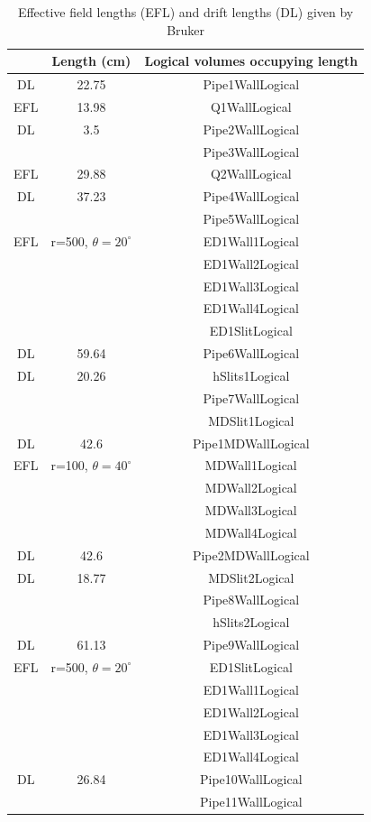 \documentclass[letter,11pt]{article}
\begin{document}
\begin{table}
\caption{Effective field lengths (EFL) and drift lengths (DL) given by Bruker}\label{tab:lengths}
\centering
\begin{threeparttable}
\begin{tabular}{ccc}
\hline
	&Length (cm)	&Logical volumes occupying length\\
\hline
DL	&22.75	&Pipe1WallLogical\\
EFL	&13.98	&Q1WallLogical\\
DL	&3.5		&Pipe2WallLogical\\
	&		&Pipe3WallLogical\\
EFL	&29.88	&Q2WallLogical\\
DL	&37.23	&Pipe4WallLogical\\
	&		&Pipe5WallLogical\\
EFL	&r=500, $\theta=20^{\circ}$\tnote{a}	&ED1Wall1Logical\\
	&		&ED1Wall2Logical\\
	&		&ED1Wall3Logical\\
	&		&ED1Wall4Logical\\
	&		&ED1SlitLogical\\
DL	&59.64	&Pipe6WallLogical\\
DL	&20.26	&hSlits1Logical\\
	&		&Pipe7WallLogical\\
	&		&MDSlit1Logical\\
DL	&42.6	&Pipe1MDWallLogical\\
EFL	&r=100, $\theta=40^{\circ}$\tnote{a}	&MDWall1Logical\\
	&		&MDWall2Logical\\
	&		&MDWall3Logical\\
	&		&MDWall4Logical\\
DL	&42.6	&Pipe2MDWallLogical\\
DL	&18.77	&MDSlit2Logical\\
	&		&Pipe8WallLogical\\
	&		&hSlits2Logical\\
DL	&61.13	&Pipe9WallLogical\\
EFL	&r=500, $\theta=20^{\circ}$\tnote{a}	&ED1SlitLogical\\
	&		&ED1Wall1Logical\\
	&		&ED1Wall2Logical\\
	&		&ED1Wall3Logical\\
	&		&ED1Wall4Logical\\
DL	&26.84	&Pipe10WallLogical\\
	&		&Pipe11WallLogical\\

\end{tabular}
\end{threeparttable}
\end{table}
\end{document}
